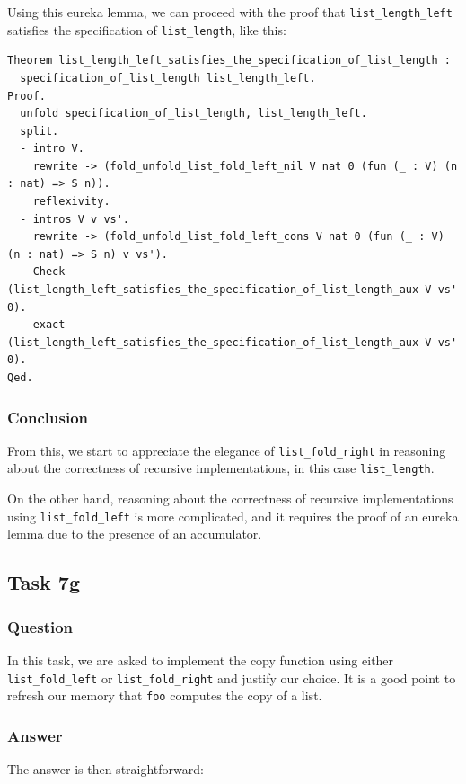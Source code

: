 \documentclass{article}
\begin{document}
Using this eureka lemma, we can proceed with the proof that \texttt{list\_length\_left} satisfies the specification of \texttt{list\_length}, like this:

\begin{lstlisting}
Theorem list_length_left_satisfies_the_specification_of_list_length :
  specification_of_list_length list_length_left.
Proof.
  unfold specification_of_list_length, list_length_left.
  split.
  - intro V.
    rewrite -> (fold_unfold_list_fold_left_nil V nat 0 (fun (_ : V) (n : nat) => S n)).
    reflexivity.
  - intros V v vs'.
    rewrite -> (fold_unfold_list_fold_left_cons V nat 0 (fun (_ : V) (n : nat) => S n) v vs').
    Check (list_length_left_satisfies_the_specification_of_list_length_aux V vs' 0).
    exact (list_length_left_satisfies_the_specification_of_list_length_aux V vs' 0).
Qed.
\end{lstlisting}

\subsubsection{Conclusion}
From this, we start to appreciate the elegance of \texttt{list\_fold\_right} in reasoning about the correctness of recursive implementations, in this case \texttt{list\_length}.

On the other hand, reasoning about the correctness of recursive implementations using \texttt{list\_fold\_left} is more complicated, and it requires the proof of an eureka lemma due to the presence of an accumulator.



\subsection{Task 7g}

\subsubsection{Question}
In this task, we are asked to implement the copy function using either \texttt{list\_fold\_left} or \texttt{list\_fold\_right} and justify our choice. It is a good point to refresh our memory that \texttt{foo} computes the copy of a list.

\subsubsection{Answer}
The answer is then straightforward:
\end{document}
